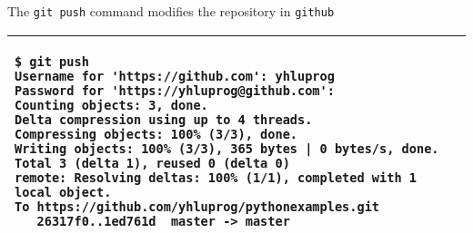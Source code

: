 The {\tt git push} command modifies the repository in {\tt github}

\vspace{0.2in}
\noindent
\begin{tabular}{|p{5in}|}\hline
\begin{verbatim}
$ git push
Username for 'https://github.com': yhluprog
Password for 'https://yhluprog@github.com': 
Counting objects: 3, done.
Delta compression using up to 4 threads.
Compressing objects: 100% (3/3), done.
Writing objects: 100% (3/3), 365 bytes | 0 bytes/s, done.
Total 3 (delta 1), reused 0 (delta 0)
remote: Resolving deltas: 100% (1/1), completed with 1 local object.
To https://github.com/yhluprog/pythonexamples.git
   26317f0..1ed761d  master -> master
\end{verbatim}
\\ \hline
\end{tabular}
\vspace{0.2in}

\begin{figure}[h] \centering
{\texttt{[image: \\thischapterpath/figures/github10.png]}}
\caption{The added file {\tt hello.py} is listed in {\tt github}.}
\label{fig:github10}
\end{figure}

A directory can be created using the {\tt mkdir} command in
Linux. Adding a file in a directory automatically to the repository
adds the directory.

To remove a file, use the {\tt git rm} command, followed by {\tt git commit}.
If {\tt git push} is used, the file is also removed from {\tt github}.

\vspace{0.2in}
\noindent
\begin{tabular}{|p{5in}|}\hline
\begin{verbatim}
$ git rm hello.py
rm 'hello.py'
$ git commit -m "remove the file" hello.py
[master 3357bae] remove the file
 1 file changed, 7 deletions(-)
 delete mode 100755 hello.py
$ git push
Username for 'https://github.com': yhluprog
Password for 'https://yhluprog@github.com': 
Counting objects: 2, done.
Delta compression using up to 4 threads.
Compressing objects: 100% (2/2), done.
Writing objects: 100% (2/2), 221 bytes | 0 bytes/s, done.
Total 2 (delta 1), reused 0 (delta 0)
remote: Resolving deltas: 100% (1/1), completed with 1 local object.
To https://github.com/yhluprog/pythonexamples.git
   1ed761d..3357bae  master -> master
\end{verbatim}
\\ \hline
\end{tabular}
\vspace{0.2in}

